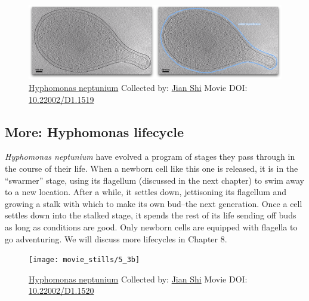 \documentclass[]{tufte-book}
\begin{document}
\begin{figure}
\includegraphics{movie_stills/5_3a} \caption[\protect\hyperlink{tree}{Hyphomonas neptunium} Collected by:
\protect\hyperlink{jian_shi}{Jian Shi} Movie DOI:
\href{https://doi.org/10.22002/D1.1519}{10.22002/D1.1519}]{\protect\hyperlink{tree}{Hyphomonas neptunium} Collected by:
\protect\hyperlink{jian_shi}{Jian Shi} Movie DOI:
\href{https://doi.org/10.22002/D1.1519}{10.22002/D1.1519}}\label{fig:5-3a}
\end{figure}

\hypertarget{Hyphomonas_lifecycle}{\subsection*{More: Hyphomonas
lifecycle}\label{Hyphomonas_lifecycle}}

\emph{Hyphomonas neptunium} have evolved a program of stages they pass
through in the course of their life. When a newborn cell like this one
is released, it is in the ``swarmer'' stage, using its flagellum
(discussed in the next chapter) to swim away to a new location. After a
while, it settles down, jettisoning its flagellum and growing a stalk
with which to make its own bud--the next generation. Once a cell settles
down into the stalked stage, it spends the rest of its life sending off
buds as long as conditions are good. Only newborn cells are equipped
with flagella to go adventuring. We will discuss more lifecycles in
Chapter 8.





\begin{figure}
\texttt{[image: movie\_stills/5\_3b]} \caption[\protect\hyperlink{tree}{Hyphomonas neptunium} Collected by:
\protect\hyperlink{jian_shi}{Jian Shi} Movie DOI:
\href{https://doi.org/10.22002/D1.1520}{10.22002/D1.1520}]{\protect\hyperlink{tree}{Hyphomonas neptunium} Collected by:
\protect\hyperlink{jian_shi}{Jian Shi} Movie DOI:
\href{https://doi.org/10.22002/D1.1520}{10.22002/D1.1520}}\label{fig:5-3b}
\end{figure}
\end{document}

